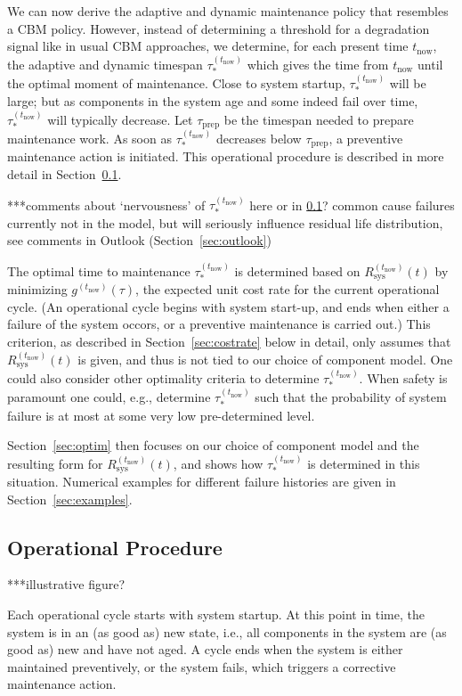 \documentclass[authoryear]{elsarticle}
\def\tnow{t_\text{now}}
\newcommand{\Rsysnow}{R^{(t_\text{now})}_\text{sys}}
\newcommand{\gnow}{g^{(\tnow)}}
\newcommand{\tausnow}{\tau_*^{(\tnow)}}
\newcommand{\tprep}{\tau_{\text{prep}}}
\begin{document}
We can now derive the adaptive and dynamic maintenance policy
that resembles a CBM policy.
However, instead of determining a threshold for a degradation signal like in usual CBM approaches,
we determine, for each present time $\tnow$,
the adaptive and dynamic timespan $\tausnow$ which gives the time from $\tnow$ until the optimal moment of maintenance.
Close to system startup, $\tausnow$ will be large;
but as components in the system age and some indeed fail over time,
$\tausnow$ will typically decrease.
Let $\tprep$ be the timespan needed to prepare maintenance work.
As soon as $\tausnow$ decreases below $\tprep$,
a preventive maintenance action is initiated.
This operational procedure is described in more detail in Section~\ref{sec:operationalprocedure}.

***comments about `nervousness' of $\tausnow$ here or in \ref{sec:operationalprocedure}?
common cause failures currently not in the model, but will seriously influence residual life distribution,
see comments in Outlook (Section~\ref{sec:outlook})

The optimal time to maintenance $\tausnow$ is determined based on $\Rsysnow(t)$
by minimizing $\gnow(\tau)$, the expected unit cost rate for the current operational cycle.
(An operational cycle begins with system start-up,
and ends when either a failure of the system occors, or a preventive maintenance is carried out.)
This criterion, as described in Section~\ref{sec:costrate} below in detail,
only assumes that $\Rsysnow(t)$ is given,
and thus is not tied to our choice of component model.
One could also consider other optimality criteria to determine $\tausnow$.
When safety is paramount one could, e.g., determine $\tausnow$ such that
the probability of system failure is at most at some very low pre-determined level.

Section~\ref{sec:optim} then focuses on our choice of component model and the resulting form for $\Rsysnow(t)$,
and shows how $\tausnow$ is determined in this situation.
Numerical examples for different failure histories are given in Section~\ref{sec:examples}.


\subsection{Operational Procedure}
\label{sec:operationalprocedure}

***illustrative figure?

Each operational cycle starts with system startup.
At this point in time, the system is in an (as good as) new state,
i.e., all components in the system are (as good as) new and have not aged.
A cycle ends when the system is either maintained preventively, %
or the system fails, which triggers a corrective maintenance action.
\end{document}
